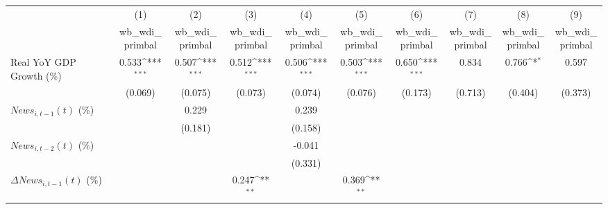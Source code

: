 {
\def\sym#1{\ifmmode^{#1}\else\(^{#1}\)\fi}
\begin{tabular}{l*{9}{c}}
\toprule
                    &\multicolumn{1}{c}{(1)}&\multicolumn{1}{c}{(2)}&\multicolumn{1}{c}{(3)}&\multicolumn{1}{c}{(4)}&\multicolumn{1}{c}{(5)}&\multicolumn{1}{c}{(6)}&\multicolumn{1}{c}{(7)}&\multicolumn{1}{c}{(8)}&\multicolumn{1}{c}{(9)}\\
                    &\multicolumn{1}{c}{wb_wdi_primbal}&\multicolumn{1}{c}{wb_wdi_primbal}&\multicolumn{1}{c}{wb_wdi_primbal}&\multicolumn{1}{c}{wb_wdi_primbal}&\multicolumn{1}{c}{wb_wdi_primbal}&\multicolumn{1}{c}{wb_wdi_primbal}&\multicolumn{1}{c}{wb_wdi_primbal}&\multicolumn{1}{c}{wb_wdi_primbal}&\multicolumn{1}{c}{wb_wdi_primbal}\\
\midrule
Real YoY GDP Growth (\%)&       0.533\sym{***}&       0.507\sym{***}&       0.512\sym{***}&       0.506\sym{***}&       0.503\sym{***}&       0.650\sym{***}&       0.834         &       0.766\sym{*}  &       0.597         \\
                    &     (0.069)         &     (0.075)         &     (0.073)         &     (0.074)         &     (0.076)         &     (0.173)         &     (0.713)         &     (0.404)         &     (0.373)         \\
\addlinespace
$ News_{i,t-1}(t)$ (\%)&                     &       0.229         &                     &       0.239         &                     &                     &                     &                     &                     \\
                    &                     &     (0.181)         &                     &     (0.158)         &                     &                     &                     &                     &                     \\
\addlinespace
$ News_{i,t-2}(t)$ (\%)&                     &                     &                     &      -0.041         &                     &                     &                     &                     &                     \\
                    &                     &                     &                     &     (0.331)         &                     &                     &                     &                     &                     \\
\addlinespace
$ \Delta News_{i,t-1}(t)$ (\%)&                     &                     &       0.247\sym{**} &                     &       0.369\sym{**} &                     &                     &                     &                     \\

\end{tabular}}
